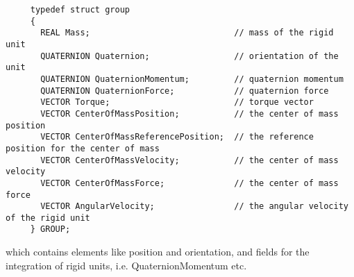 \begin{footnotesize}
\begin{verbatim}
     typedef struct group
     {
       REAL Mass;                             // mass of the rigid unit
       QUATERNION Quaternion;                 // orientation of the unit
       QUATERNION QuaternionMomentum;         // quaternion momentum
       QUATERNION QuaternionForce;            // quaternion force
       VECTOR Torque;                         // torque vector
       VECTOR CenterOfMassPosition;           // the center of mass position
       VECTOR CenterOfMassReferencePosition;  // the reference position for the center of mass
       VECTOR CenterOfMassVelocity;           // the center of mass velocity
       VECTOR CenterOfMassForce;              // the center of mass force
       VECTOR AngularVelocity;                // the angular velocity of the rigid unit
     } GROUP;
\end{verbatim}
\end{footnotesize}
which contains elements like position and orientation, and fields for the integration of rigid units, i.e. QuaternionMomentum etc.

